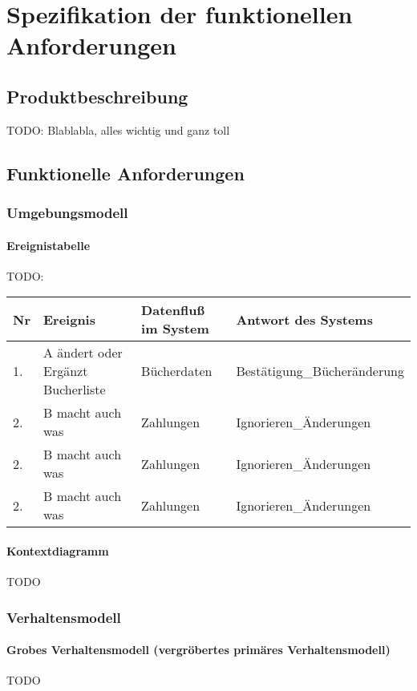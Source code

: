 \chapter{Spezifikation der funktionellen Anforderungen}
\section{Produktbeschreibung}
TODO: Blablabla, alles wichtig und ganz toll

\section{Funktionelle Anforderungen}
\subsection{Umgebungsmodell}

\subsubsection{Ereignistabelle}
TODO:
\begin{tabular}[ht]{|l|l|l|l|}
\hline
Nr & Ereignis & Datenfluß im System & Antwort des Systems \\
\hline\hline
1. & A ändert oder Ergänzt Bucherliste & Bücherdaten & Bestätigung\_Bücheränderung \\
2. & B macht auch was & Zahlungen & Ignorieren\_Änderungen \\
2. & B macht auch was & Zahlungen & Ignorieren\_Änderungen \\
2. & B macht auch was & Zahlungen & Ignorieren\_Änderungen \\
\hline
\end{tabular}

\subsubsection{Kontextdiagramm}
TODO

\subsection{Verhaltensmodell}
\subsubsection{Grobes Verhaltensmodell (vergröbertes primäres Verhaltensmodell)}
TODO

